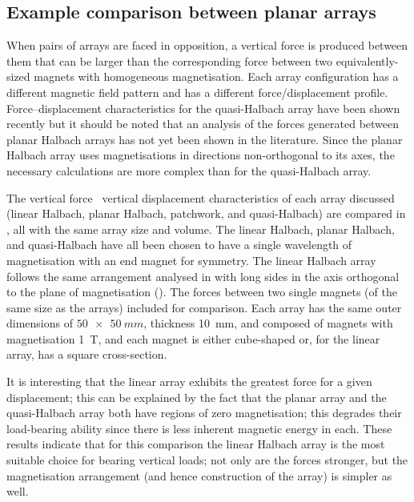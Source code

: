\documentclass[11pt,a4paper]{memoir}
\begin{document}
\subsection{Example comparison between planar arrays}

When pairs of arrays are faced in opposition, a vertical force is produced between them that can be larger than the corresponding force between two equivalently-sized magnets with homogeneous magnetisation.
Each array configuration has a different magnetic field pattern and has a different force/displacement profile.
Force--displacement characteristics for the quasi-Halbach array have been shown recently \cite{janssen2009-jsdd} but it should be noted that an analysis of the forces generated between planar Halbach arrays has not yet been shown in the literature.
Since the planar Halbach array uses magnetisations in directions non-orthogonal to its axes, the necessary calculations are more complex than for the quasi-Halbach array.

The vertical force \vs\ vertical displacement characteristics of each array discussed (linear Halbach, planar Halbach, patchwork, and quasi-Halbach) are compared in , all with the same array size and volume.
The linear Halbach, planar Halbach, and quasi-Halbach have all been chosen to have a single wavelength of magnetisation with an end magnet for symmetry.
The linear Halbach array follows the same arrangement analysed in  with long sides in the axis orthogonal to the plane of magnetisation ().
The forces between two single magnets (of the same size as the arrays) included for comparison.
Each array has the same outer dimensions of $\SI{50x50}{mm}$, thickness \SI{10}{mm}, and composed of magnets with magnetisation \SI{1}{T}, and each magnet is either cube-shaped or, for the linear array, has a square cross-section.

It is interesting that the linear array exhibits the greatest force for a given displacement; this can be explained by the fact that the planar array and the quasi-Halbach array both have regions of zero magnetisation; this degrades their load-bearing ability since there is less inherent magnetic energy in each.
These results indicate that for this comparison the linear Halbach array is the most suitable choice for bearing vertical loads; not only are the forces stronger, but the magnetisation arrangement (and hence construction of the array) is simpler as well.
\end{document}
